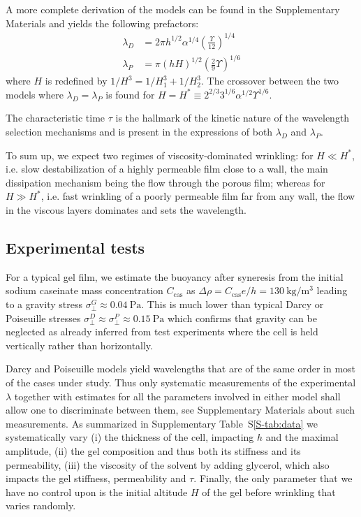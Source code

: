 \documentclass[twocolumn,superscriptaddress,showpacs,preprintnumbers, amsmath,amssymb,prl]{revtex4-1}
\begin{document}
A more complete derivation of the models can be found in the Supplementary Materials and yields the following prefactors:
\begin{align}
\lambda_D &= 2\pi h^{1/2}\alpha^{1/4}\left(\frac{\Upsilon}{12}\right)^{1/4}\label{eq:prefDarcy}\\
\lambda_P &= \pi (hH)^{1/2}\left(\frac{2}{9}\Upsilon\right)^{1/6}\label{eq:prefPoiseuille}
\end{align}
where $H$ is redefined by $1/H^3 = 1/H_1^3 + 1/H_2^3$. The crossover between the two models where $\lambda_D=\lambda_P$ is found for $H = H^* \equiv 2^{2/3} 3^{1/6} \alpha^{1/2} \Upsilon^{1/6}$.

The characteristic time $\tau$ is the hallmark of the kinetic nature of the wavelength selection mechanisms and is present in the expressions of both $\lambda_D$ and $\lambda_P$. 

To sum up, we expect two regimes of viscosity-dominated wrinkling: for $H\ll H^*$, i.e. slow destabilization of a highly permeable film close to a wall, the main dissipation mechanism being the flow through the porous film; whereas for $H\gg H^*$, i.e. fast wrinkling of a poorly permeable film far from any wall, the flow in the viscous layers dominates and sets the wavelength.

\subsection*{Experimental tests}

For a typical gel film, we estimate the buoyancy after syneresis from the initial sodium caseinate mass concentration $C_\text{cas}$ as $\Delta\rho=C_\text{cas} e/h = \SI{130}{\kilo\gram\per\cubic\metre}$ leading to a gravity stress $\sigma_\perp^G \approx \SI{0.04}{\pascal}$. This is much lower than typical Darcy or Poiseuille stresses $\sigma_\perp^D \approx \sigma_\perp^P \approx \SI{0.15}{\pascal}$ which confirms that gravity can be neglected as already inferred from test experiments where the cell is held vertically rather than horizontally.


Darcy and Poiseuille models yield wavelengths that are of the same order in most of the cases under study. Thus only systematic measurements of the experimental $\lambda$ together with estimates for all the parameters involved in either model shall allow one to discriminate between them, see Supplementary Materials about such measurements. As summarized in Supplementary Table~S\ref{S-tab:data} we systematically vary (i) the thickness of the cell, impacting $h$ and the maximal amplitude, (ii) the gel composition and thus both its stiffness and its permeability, (iii) the viscosity of the solvent by adding glycerol, which also impacts the gel stiffness, permeability and $\tau$. Finally, the only parameter that we have no control upon is the initial altitude $H$ of the gel before wrinkling that varies randomly. 
\end{document}
